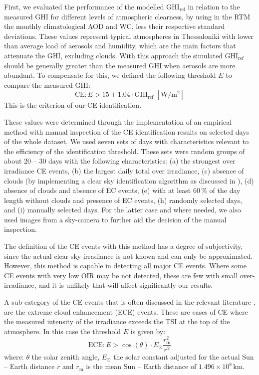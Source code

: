 \documentclass[preprint, 5p,
authoryear]{elsarticle} %
\begin{document}
First, we evaluated the performance of the modelled
\(\text{GHI}_\text{ref}\) in relation to the measured GHI for different
levels of atmospheric clearness, by using in the RTM the monthly
climatological AOD and WC, less their respective standard deviations.
These values represent typical atmospheres in Thessaloniki with lower
than average load of aerosols and humidity, which are the main factors
that attenuate the GHI, excluding clouds. With this approach the
simulated \(\text{GHI}_\text{ref}\) should be generally greater than the
measured GHI when aerosols are more abundant. To compensate for this, we
defined the following threshold \(E\) to compare the measured
\(\text{GHI}\): \begin{equation}
\text{CE} : E > 15 + 1.04 \cdot \text{GHI}_\text{ref} \,\,[\text{W}/\text{m}^2] \label{eq:CE4}
\end{equation} This is the criterion of our CE identification.

These values were determined through the implementation of an empirical
method with manual inspection of the CE identification results on
selected days of the whole dataset. We used seven sets of days with
characteristics relevant to the efficiency of the identification
threshold. These sets were random groups of about 20 -- 30 days with the
following characteristics: (a) the strongest over irradiance CE events,
(b) the largest daily total over irradiance, (c) absence of clouds (by
implementing a clear sky identification algorithm as discussed in
\citet{Natsis2023}), (d) absence of clouds and absence of EC events, (e)
with at least \(60\,\%\) of the day length without clouds and presence
of EC events, (h) randomly selected days, and (i) manually selected
days. For the latter case and where needed, we also used images from a
sky-camera to further aid the decision of the manual inspection.

The definition of the CE events with this method has a degree of
subjectivity, since the actual clear sky irradiance is not known and can
only be approximated. However, this method is capable in detecting all
major CE events. Where some CE events with very low OIR may be not
detected, these are few with small over-irradiance, and it is unlikely
that will affect significantly our results.

A sub-category of the CE events that is often discussed in the relevant
literature \citep{Cordero2023, Martins2022, Yordanov2015}, are the
extreme cloud enhancement (ECE) events. These are cases of CE where the
measured intensity of the irradiance exceeds the TSI at the top of the
atmosphere. In this case the threshold \(E\) is given by:
\begin{equation}
\text{ECE}: E > \cos(\theta) \cdot E_{\odot} \frac{r^2_\text{m}} {r^2}
\label{eq:ECE}
\end{equation} where: \(\theta\) the solar zenith angle, \(E_{\odot}\)
the solar constant adjusted for the actual Sun -- Earth distance \(r\)
and \(r_\text{m}\) is the mean Sun -- Earth distance of
\(1.496\times10^8\,\text{km}\).
\end{document}
